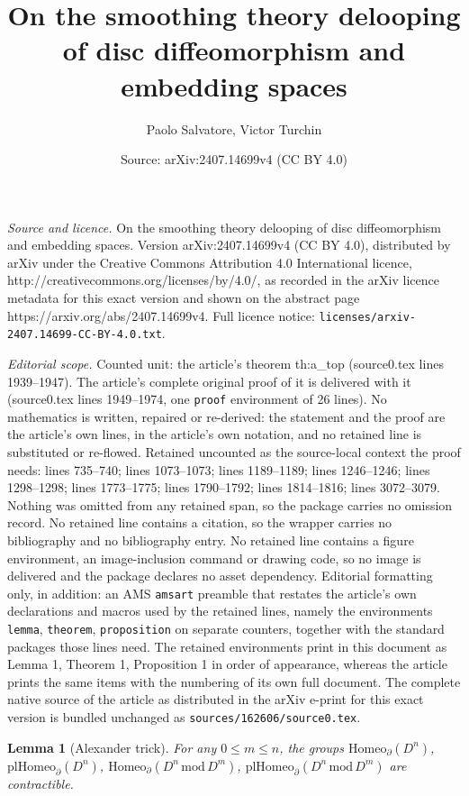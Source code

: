 \documentclass[10pt,a4paper]{amsart}
\title{On the smoothing theory delooping of disc diffeomorphism and embedding spaces}
\author{Paolo Salvatore, Victor Turchin}
\date{Source: arXiv:2407.14699v4 (CC BY 4.0)}
\newtheorem{lemma}{Lemma}
\newcommand{\Homeo}{\mathrm{Homeo}}
\newcommand{\mmod}{\,\mathrm{mod}\,}
\newcommand{\pdHomeo}{\mathrm{pdHomeo}}
\newcommand{\plHomeo}{\mathrm{plHomeo}}
\begin{document}
\maketitle

\noindent\emph{Source and licence.} On the smoothing theory delooping of disc diffeomorphism and embedding spaces. Version arXiv:2407.14699v4 (CC BY 4.0), distributed by arXiv under the Creative Commons Attribution 4.0 International licence, http://creativecommons.org/licenses/by/4.0/, as recorded in the arXiv licence metadata for this exact version and shown on the abstract page https://arxiv.org/abs/2407.14699v4. Full licence notice: \texttt{licenses/arxiv-2407.14699-CC-BY-4.0.txt}.\par\smallskip

\noindent\textit{Editorial scope.} Counted unit: the article's theorem th:a\_top (source0.tex lines 1939--1947). The article's complete original proof of it is delivered with it (source0.tex lines 1949--1974, one \texttt{proof} environment of 26 lines). No mathematics is written, repaired or re-derived: the statement and the proof are the article's own lines, in the article's own notation, and no retained line is substituted or re-flowed.  Retained uncounted as the source-local context the proof needs: lines 735--740; lines 1073--1073; lines 1189--1189; lines 1246--1246; lines 1298--1298; lines 1773--1775; lines 1790--1792; lines 1814--1816; lines 3072--3079.  Nothing was omitted from any retained span, so the package carries no omission record.  No retained line contains a citation, so the wrapper carries no bibliography and no bibliography entry.  No retained line contains a figure environment, an image-inclusion command or drawing code, so no image is delivered and the package declares no asset dependency.  Editorial formatting only, in addition: an AMS \texttt{amsart} preamble that restates the article's own declarations and macros used by the retained lines, namely the environments \texttt{lemma}, \texttt{theorem}, \texttt{proposition} on separate counters, together with the standard packages those lines need.  The retained environments print in this document as Lemma 1, Theorem 1, Proposition 1 in order of appearance, whereas the article prints the same items with the numbering of its own full document.  The complete native source of the article as distributed in the arXiv e-print for this exact version is bundled unchanged as \texttt{sources/162606/source0.tex}.
\begin{lemma}[Alexander trick]\label{l:alex}
For any $0\leq m\leq n$, the groups $\Homeo_\partial(D^n)$, $\plHomeo_\partial(D^n)$, %
 $\Homeo_\partial(D^n\mmod D^m)$, 
$\plHomeo_\partial(D^n\mmod D^m)$ %
 are contractible.
\end{lemma} 
\end{document}
